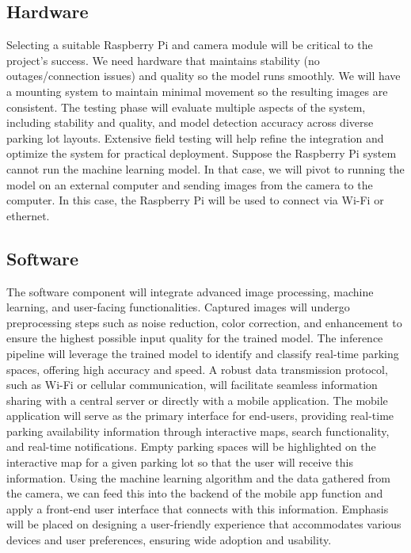 \documentclass[conference]{IEEEtran}
\begin{document}
\subsection{Hardware}
Selecting a suitable Raspberry Pi and camera module will be critical to the project’s success. 
We need hardware that maintains stability 
(no outages/connection issues) 
and quality so the model runs smoothly. 
We will have a mounting system to maintain minimal movement so the resulting images are consistent. 
The testing phase will evaluate multiple aspects of the system, 
including stability and quality, 
and model detection accuracy across diverse parking lot layouts. 
Extensive field testing will help refine the integration and optimize the system for practical deployment. 
Suppose the Raspberry Pi system cannot run the machine learning model. 
In that case, 
we will pivot to running the model on an external computer and sending images from the camera to the computer. 
In this case, 
the Raspberry Pi will be used to connect via Wi-Fi or ethernet.

\subsection{Software}
The software component will integrate advanced image processing, 
machine learning, 
and user-facing functionalities. 
Captured images will undergo preprocessing steps such as noise reduction, 
color correction, 
and enhancement to ensure the highest possible input quality for the trained model. 
The inference pipeline will leverage the trained model to identify and classify real-time parking spaces, 
offering high accuracy and speed. 
A robust data transmission protocol, 
such as Wi-Fi or cellular communication, 
will facilitate seamless information sharing with a central server or directly with a mobile application. 
The mobile application will serve as the primary interface for end-users, 
providing real-time parking availability information through interactive maps, 
search functionality, 
and real-time notifications. 
Empty parking spaces will be highlighted on the interactive map for a given parking lot so that the user will receive this information. 
Using the machine learning algorithm and the data gathered from the camera, 
we can feed this into the backend of the mobile app function and apply a front-end user interface that connects with this information. 
Emphasis will be placed on designing a user-friendly experience that accommodates various devices and user preferences, 
ensuring wide adoption and usability.
\end{document}
